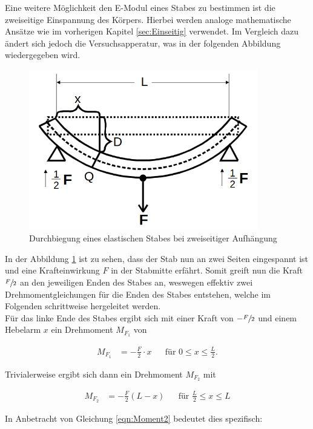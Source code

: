 Eine weitere Möglichkeit den E-Modul eines Stabes zu bestimmen ist die zweiseitige Einspannung des Körpers. Hierbei werden
analoge mathematische Ansätze wie im vorherigen Kapitel \ref{sec:Einseitig} verwendet. Im Vergleich dazu ändert sich jedoch 
die Versuchsapperatur, was in der folgenden Abbildung wiedergegeben wird.

\begin{figure}
    \centering
    \includegraphics[height=7cm]{Zweiseitig.png}
    \caption{Durchbiegung eines elastischen Stabes bei zweiseitiger Aufhängung}
    \label{fig:Zweiseitig}
\end{figure}

In der Abbildung \ref{fig:Zweiseitig} ist zu sehen, dass der Stab nun an zwei Seiten eingespannt ist und eine Krafteinwirkung $F$
in der Stabmitte erfährt. Somit greift nun die Kraft $\sfrac{F}{2}$ an den jeweiligen Enden des Stabes an, weswegen effektiv
zwei Drehmomentgleichungen für die Enden des Stabes entstehen, welche im Folgenden schrittweise hergeleitet werden.\\
\noindent Für das linke Ende des Stabes ergibt sich mit einer Kraft von $-\sfrac{F}{2}$ und einem Hebelarm $x$ ein Drehmoment $M_{F_1}$ von

\begin{align*}
    M_{F_1} &= -\frac{F}{2}\cdot x & &\text{für}\,\, 0 \leq x \leq \frac{L}{2}.
\end{align*}

\noindent Trivialerweise ergibt sich dann ein Drehmoment $M_{F_2}$ mit

\begin{align*}
    M_{F_2} &= -\frac{F}{2}\left(L-x\right) & &\text{für}\,\, \frac{L}{2} \leq x \leq L 
\end{align*}

\noindent In Anbetracht von Gleichung \eqref{eqn:Moment2} bedeutet dies spezifisch:

